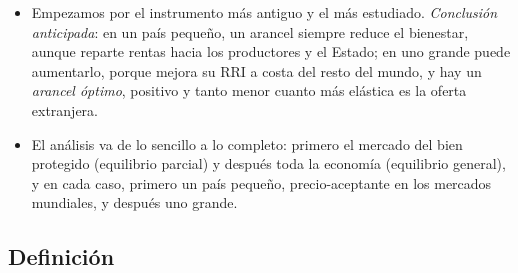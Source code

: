 \documentclass[11pt]{article}
\begin{document}
\begin{itemize}
\item Empezamos por el instrumento más antiguo y el más estudiado. \emph{Conclusión anticipada}: en un país pequeño, un arancel siempre reduce el bienestar, aunque reparte rentas hacia los productores y el Estado; en uno grande puede aumentarlo, porque mejora su RRI a costa del resto del mundo, y hay un \emph{arancel óptimo}, positivo y tanto menor cuanto más elástica es la oferta extranjera.
\item El análisis va de lo sencillo a lo completo: primero el mercado del bien protegido (equilibrio parcial) y después toda la economía (equilibrio general), y en cada caso, primero un país pequeño, precio-aceptante en los mercados mundiales, y después uno grande.
\end{itemize}

\subsection{Definición}\label{sec:definicion}
\end{document}
